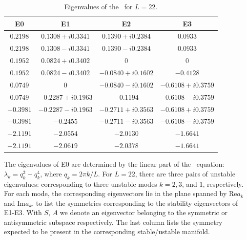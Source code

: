 \begin{table}[!ht]
\caption{\label{tab:Ek_eigs} Eigenvalues of the \eqva\ for $L=22$.}
{\small
\begin{tabular}{cccc} \hline
  E0       &        E1         &         E2        &     E3   \\\hline
  $0.2198$ &  $0.1308+i0.3341$ &  $0.1390+i0.2384$ &  $0.0933$\\
  $0.2198$ &  $0.1308-i0.3341$ &  $0.1390-i0.2384$ &  $0.0933$\\
  $0.1952$ &  $0.0824+i0.3402$ &  $0$              &  $0$\\
  $0.1952$ &  $0.0824-i0.3402$ & $-0.0840+i0.1602$ & $-0.4128$\\
  $0.0749$ &  $0$              & $-0.0840-i0.1602$ & $-0.6108+i0.3759$\\
  $0.0749$ & $-0.2287+i0.1963$ & $-0.1194$         & $-0.6108-i0.3759$\\
 $-0.3981$ & $-0.2287-i0.1963$ & $-0.2711+i0.3563$ & $-0.6108+i0.3759$\\
 $-0.3981$ & $-0.2455$         & $-0.2711-i0.3563$ & $-0.6108-i0.3759$\\
 $-2.1191$ & $-2.0554$         & $-2.0130$         & $-1.6641$\\
 $-2.1191$ & $-2.0619$         & $-2.0378$         & $-1.6641$\\\hline
\end{tabular}}
\end{table}

The eigenvalues of E0 are determined by the linear part of the \KS\
equation: $\lambda_k=q_k^2-q_k^4$, where $q_k = 2\pi k/L$.  For
$L=22$, there are three pairs of unstable eigenvalues: corresponding
to three unstable modes $k=2,3$, and 1, respectively.  For each
mode, the corresponding eigenvectors lie in the plane spanned by
$\mathrm{Re} a_k$ and $\mathrm{Im} a_k$. \refTab{tab:E1_sym} to 
list the symmetries corresponding to the stability eigenvectors of \eqva E1-E3.
With $S$, $A$ we denote an eigenvector belonging to the symmetric
or antisymmetric subspace respectively. The last column lists
the symmetry expected to be present in the corresponding
stable/ustable manifold.

